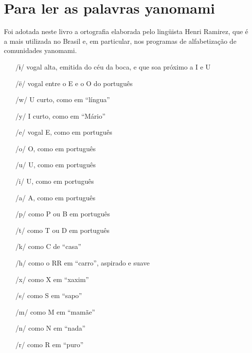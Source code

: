 \chapter{Para ler as palavras yanomami}


Foi adotada neste livro a ortografia elaborada pelo lingüista Henri Ramirez, que é a mais utilizada no Brasil e, em particular, nos programas de alfabetização de comunidades yanomami. 

\begin{itemize}
\item[/ɨ/] vogal alta, emitida do céu da boca, e que soa próximo a I e U
\item[/ë/] vogal entre o E e o O do português
\item[/w/] U curto, como em “língua”
\item[/y/] I curto, como em “Mário”
\item[/e/] vogal E, como em português
\item[/o/] O, como em português
\item[/u/] U, como em português
\item[/i/] U, como em português
\item[/a/] A, como em português
\item[/p/] como P ou B em português
\item[/t/] como T ou D em português
\item[/k/] como C de “casa”
\item[/h/] como o RR em “carro”, aspirado e suave
\item[/x/] como X em “xaxim”
\item[/s/] como S em “sapo”
\item[/m/] como M em “mamãe”
\item[/n/] como N em “nada”
\item[/r/] como R em “puro”
\end{itemize}